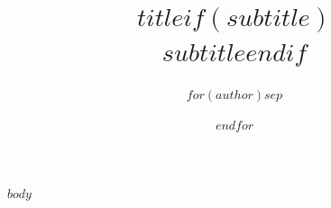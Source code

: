\documentclass[conference]{IEEEtran}
\begin{document}
\title{$title$$if(subtitle)$\\\large $subtitle$$endif$}
\author{$for(author)$$sep$\and $endfor$}
\maketitle

$body$
\end{document}
